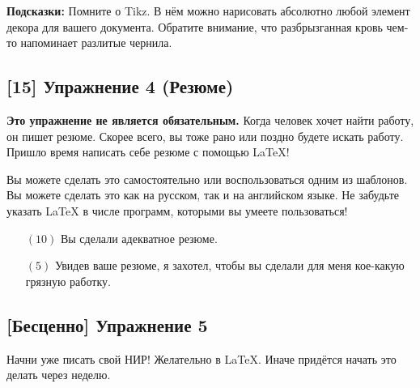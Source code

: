 \documentclass[12pt, a4paper, oneside]{article}
\begin{document}
\textbf{Подсказки:}  Помните о Tikz. В нём можно нарисовать абсолютно любой элемент декора для вашего документа. Обратите внимание, что разбрызганная кровь чем-то напоминает разлитые чернила.


\subsection*{[15]  Упражнение 4 (Резюме)}

\textbf{Это упражнение не является обязательным.}  Когда человек хочет найти работу, он пишет резюме. Скорее всего, вы тоже рано или поздно будете искать работу. Пришло время написать себе резюме с помощью \LaTeX{}!

Вы можете сделать это самостоятельно или воспользоваться одним из шаблонов. Вы можете сделать это как на русском, так и на английском языке. Не забудьте указать  \LaTeX{} в числе программ, которыми вы умеете пользоваться!

\begin{itemize}
\item[$(10)$] Вы сделали адекватное резюме.
\item[$(5)$] Увидев ваше резюме, я захотел, чтобы вы сделали для меня кое-какую грязную работку.
\end{itemize}


\subsection*{ [Бесценно]  Упражнение 5}

Начни уже писать свой НИР! Желательно в  \LaTeX.  Иначе придётся начать это делать через неделю. 
\end{document}
